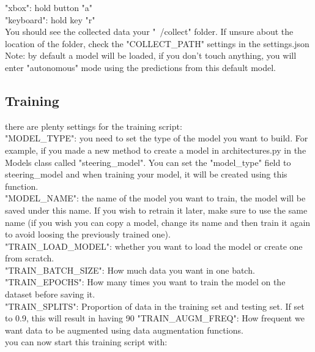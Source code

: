 \documentclass[12pt]{article}
\begin{document}
"xbox": hold button "a"\\
"keyboard": hold key "r"\\
You should see the collected data your "~/collect" folder. If unsure about the location of the folder, check the "COLLECT_PATH" settings in the settings.json\\

Note: by default a model will be loaded, if you don't touch anything, you will enter "autonomous" mode using the predictions from this default model.\\


\subsection{Training}
there are plenty settings for the training script:\\
"MODEL_TYPE": you need to set the type of the model you want to build. For example, if you made a new method to create a model in architectures.py in the Models class called "steering_model". You can set the "model_type" field to steering_model and when training your model, it will be created using this function.\\
"MODEL_NAME": the name of the model you want to train, the model will be saved under this name. If you wish to retrain it later, make sure to use the same name (if you wish you can copy a model, change its name and then train it again to avoid loosing the previously trained one).\\
"TRAIN_LOAD_MODEL": whether you want to load the model or create one from scratch.\\
"TRAIN_BATCH_SIZE": How much data you want in one batch.\\
"TRAIN_EPOCHS": How many times you want to train the model on the dataset before saving it.\\
"TRAIN_SPLITS": Proportion of data in the training set and testing set. If set to 0.9, this will result in having 90%
"TRAIN_AUGM_FREQ": How frequent we want data to be augmented using data augmentation functions.\\


you can now start this training script with:\\
\noindent{}\\
\end{document}

